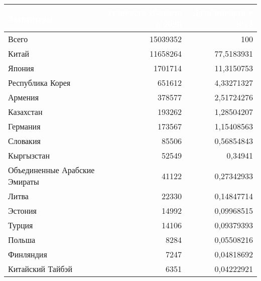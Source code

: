 \footnotesize{
\begin{tabularx}{\textwidth}{|X|r|r|}
    \hline
\rowcolor{black} \textcolor{white}{\textbf{Экспортеры}} & \textcolor{white}{\textbf{стоимость Импорта в 2023}} & \textcolor{white}{\textbf{Доля импорта в 2023}} \\ \hline
Всего & 15039352 & 100 \\ \hline
Китай & 11658264 & 77,5183931 \\ \hline
Япония & 1701714 & 11,3150753 \\ \hline
Республика Корея & 651612 & 4,33271327 \\ \hline
Армения & 378577 & 2,51724276 \\ \hline
Казахстан & 193262 & 1,28504207 \\ \hline
Германия & 173567 & 1,15408563 \\ \hline
Словакия & 85506 & 0,56854843 \\ \hline
Кыргызстан & 52549 & 0,34941 \\ \hline
Объединенные Арабские Эмираты & 41122 & 0,27342933 \\ \hline
Литва & 22330 & 0,14847714 \\ \hline
Эстония & 14992 & 0,09968515 \\ \hline
Турция & 14106 & 0,09379393 \\ \hline
Польша & 8284 & 0,05508216 \\ \hline
Финляндия & 7247 & 0,04818692 \\ \hline
Китайский Тайбэй & 6351 & 0,04222921 \\ \hline
\end{tabularx}
}